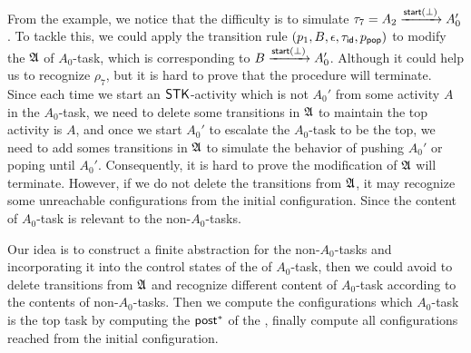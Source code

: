 From the example, we notice that the difficulty is to simulate $\tau_7 = A_2\xrightarrow{{\mathsf{start} }(\bot)} A_0'$. To tackle this, we could apply the transition rule $(p_1, B, \epsilon, \tau_{\mathsf{id}}, p_{\mathsf{pop}})$ to modify the {\WOTrNFA} ${\mathfrak{A} }$ of $A_0$-task, which is corresponding to $B\xrightarrow{{\mathsf{start} }(\bot)}A_0'$. 
Although it could help us to recognize $\rho_7$, but it is hard to prove that the procedure will terminate. Since each time we start an $\mathsf{STK}$-activity which is not $A_0'$ from some activity $A$ in the $A_0$-task, we need to delete some transitions in ${\mathfrak{A} }$ to maintain the top activity is $A$, and once we start $A_0'$ to escalate the $A_0$-task to be the top, we need to add somes transitions in ${\mathfrak{A} }$ to simulate the behavior of pushing $A_0'$ or poping until $A_0'$. Consequently, it is hard to prove the modification of ${\mathfrak{A} }$ will terminate.
However, if we do not delete the transitions from ${\mathfrak{A} }$, it may recognize some unreachable configurations from the initial configuration. Since the content of $A_0$-task is relevant to the non-$A_0$-tasks. 

Our idea is to construct a finite abstraction for the non-$A_0$-tasks and incorporating it into the control states of the {\WOTrPDS} of $A_0$-task, then we could avoid to delete transitions from ${\mathfrak{A} }$ and recognize different content of $A_0$-task according to the contents of non-$A_0$-tasks.
Then we compute the configurations which $A_0$-task is the top task by computing the ${\mathsf{post} }^*$ of the {\WOTrPDS}, finally compute all configurations reached from the initial configuration.




